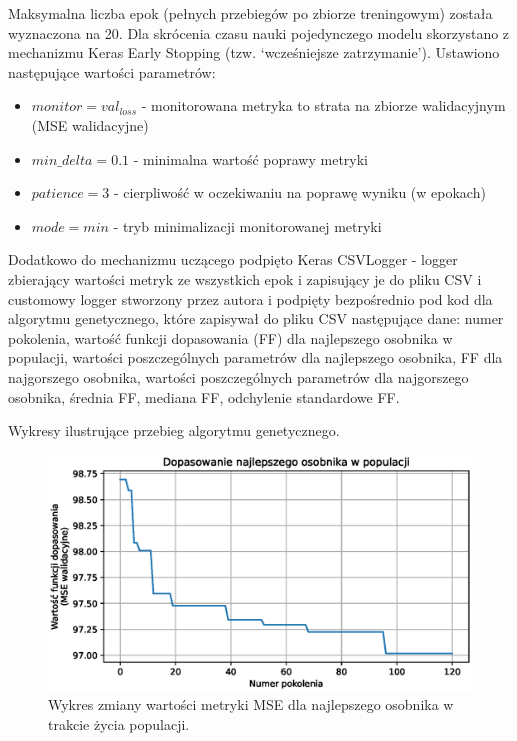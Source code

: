 \documentclass[a4paper,12pt]{article}
\numberwithin{figure}{section}
\begin{document}
    \bigskip

    Maksymalna liczba epok (pełnych przebiegów po zbiorze treningowym) została wyznaczona na 20. Dla skrócenia czasu nauki pojedynczego modelu skorzystano z mechanizmu Keras Early Stopping (tzw. `wcześniejsze zatrzymanie'). Ustawiono następujące wartości parametrów:
    \begin{itemize}
        \item $monitor = val_{loss}$ - monitorowana metryka to strata na zbiorze walidacyjnym (MSE walidacyjne)
        \item $min\_delta = 0.1$ - minimalna wartość poprawy metryki
        \item $patience = 3$ - cierpliwość w oczekiwaniu na poprawę wyniku (w epokach)
        \item $mode = min$ - tryb minimalizacji monitorowanej metryki
    \end{itemize}

    \bigskip

    Dodatkowo do mechanizmu uczącego podpięto Keras CSVLogger - logger zbierający wartości metryk ze wszystkich epok i zapisujący je do pliku CSV i customowy logger stworzony przez autora i podpięty bezpośrednio pod kod dla algorytmu genetycznego, które zapisywał do pliku CSV następujące dane: numer pokolenia, wartość funkcji dopasowania (FF) dla najlepszego osobnika w populacji, wartości poszczególnych parametrów dla najlepszego osobnika, FF dla najgorszego osobnika, wartości poszczególnych parametrów dla najgorszego osobnika, średnia FF, mediana FF, odchylenie standardowe FF.

    \bigskip

    Wykresy ilustrujące przebieg algorytmu genetycznego.

    \bigskip

    \begin{figure}[H]
        \centering
        \includegraphics[width=\textwidth]{g_a_best_fitness}
        \caption{Wykres zmiany wartości metryki MSE dla najlepszego osobnika w trakcie życia populacji.}
        \label{fig:g_a_best_fitness}
    \end{figure}
\end{document}
